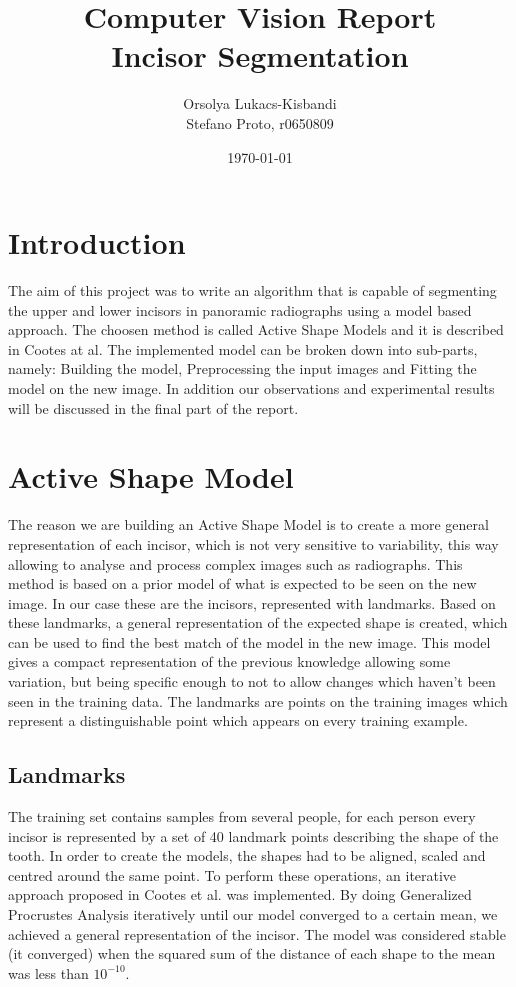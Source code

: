 \documentclass[a4paper]{article}
\author{Orsolya Lukacs-Kisbandi \\
		Stefano Proto, r0650809}
\title{ \textbf{Computer Vision Report \\ 
		Incisor Segmentation} }
\date{\today}
\begin{document}
\maketitle
\newpage
\setcounter{page}{1}
\tableofcontents


\section{Introduction}

The aim of this project was to write  an  algorithm  that  is  capable  of  segmenting  the upper and lower incisors in panoramic radiographs  using  a  model  based  approach. The choosen method is called Active Shape Models and it is described in \cite{cootes1} Cootes at al. The implemented model can be broken down into sub-parts, namely: Building the model, Preprocessing the input images and Fitting the model on the new image. In addition our observations and experimental results will be discussed in the final part of the report. 

\section{Active Shape Model}

The reason we are building an Active Shape Model is to create a more general representation of each incisor, which is not very sensitive to variability, this way allowing to analyse and process complex images such as radiographs. This method is based on a prior model of what is expected to be seen on the new image. In our case these are the incisors, represented with landmarks. Based on these landmarks, a general representation of the expected shape is created, which can be used to find the best match of the model in the new image. This model gives a compact representation of the previous knowledge allowing some variation, but being specific enough to not to allow changes which haven't been seen in the training data. The landmarks are points on the training images which represent a distinguishable point which appears on every training example.

\subsection{Landmarks} %
The training set contains samples from several people, for each person every incisor is represented by a set of 40 landmark points describing the shape of the tooth. In order to create the models, the shapes had to be aligned, scaled and centred around the same point. To perform these operations, an iterative approach proposed in \cite{cootes1} Cootes et al. was implemented. By doing Generalized Procrustes Analysis iteratively until our model converged to a certain mean, we achieved a general representation of the incisor. The model was considered stable (it converged) when the squared sum of the distance of each shape to the mean was less than $10^{-10}$.
\end{document}
